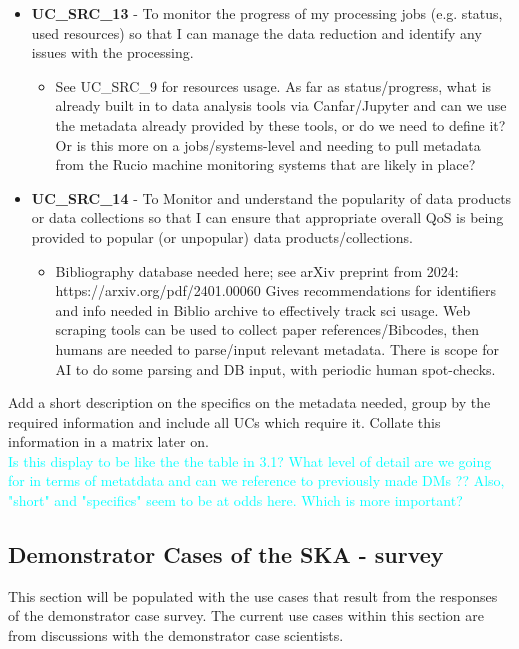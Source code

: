 \begin{itemize}[label={}]
\begin{itemize}[label={}]
    \end{itemize}
    \item {\bf UC\_SRC\_13} - To monitor the progress of my processing jobs (e.g. status, used resources) so that I can manage the data reduction and identify any issues with the processing.
    \begin{itemize}[label={}]
        \item See UC\_SRC\_9 for resources usage.  As far as status/progress, what is already built in to data analysis tools via Canfar/Jupyter and can we use the metadata already provided by these tools, or do we need to define it?  Or is this more on a jobs/systems-level and needing to pull metadata from the Rucio machine monitoring systems that are likely in place?
    \end{itemize}
    \item {\bf UC\_SRC\_14} - To Monitor and understand the popularity of data products or data collections so that I can ensure that appropriate overall QoS is being provided to popular (or unpopular) data products/collections.
    \begin{itemize}[label={}]
        \item Bibliography database needed here; see arXiv preprint from 2024: 
        https://arxiv.org/pdf/2401.00060 
        Gives recommendations for identifiers and info needed in Biblio archive to effectively track sci usage.  Web scraping tools can be used to collect paper references/Bibcodes, then humans are needed to parse/input relevant metadata.  There is scope for AI to do some parsing and DB input, with periodic human spot-checks.
    \end{itemize}
\end{itemize}


Add a short description on the specifics on the metadata needed, group by the required information and include all UCs which require it. 
Collate this information in a matrix later on. 
\\
\textcolor{cyan}{
Is this display to be like the the table in 3.1?  
What level of detail are we going for in terms of metatdata and can we reference to previously made DMs ??
Also, "short" and "specifics" seem to be at odds here.  Which is more important?  
}

\subsection{Demonstrator Cases of the SKA - survey}

This section will be populated with the use cases that result from the responses of the demonstrator case survey. The current use cases within this section are from discussions with the demonstrator case scientists.

